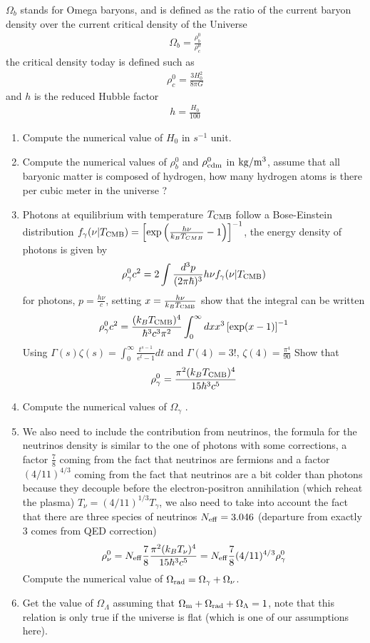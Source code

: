 \documentclass[a4paper, 11pt]{article}
\def\ba{\begin{eqnarray}}
\def\ea{\end{eqnarray}}
\begin{document}
$\Omega_{b}$ stands for Omega baryons, and is defined as the ratio of the current baryon density  over the current critical density of the Universe 
\ba
\Omega_{b} = \frac{\rho^{0}_{b}}{\rho^{0}_{c}}  \nonumber
\ea
the critical density today is defined such as
\ba
\rho^{0}_{c} = \frac{3H^{2}_{0}}{8\pi G}
\ea 
and $h$ is the reduced Hubble factor 
\ba
h = \frac{H_{0}}{100}
\ea
\begin{enumerate}
\item Compute the numerical value of $H_{0}$ in $s^{-1}$ unit.
\item Compute the numerical values of $\rho^{0}_{b}$ and $\rho^{0}_{\rm cdm}$ in $\rm{kg}/m^{3}$,  assume that all baryonic matter is composed of hydrogen, how many hydrogen atoms is there per cubic meter in the universe ?
\item Photons at equilibrium with temperature $T_{\rm CMB}$ follow a Bose-Einstein distribution $f_{\gamma}(\nu | T_{\rm CMB}) = \left[\exp \left(\frac{h\nu}{k_{B}T_{CMB}}-1\right)\right]^{-1}$, the energy density of photons is given by
\ba
\rho^{0}_{\gamma} c^{2}= 2 \int \frac{d^{3}p}{(2\pi \hbar)^{3}} h\nu f_{\gamma}(\nu | T_{\rm CMB}) 
\ea
for photons, $p = \frac{h\nu}{ c}$, setting $x = \frac{h\nu}{k_{B}T_{\rm CMB}}$ show that the integral can be written
\ba
\rho^{0}_{\gamma} c^{2}= \frac{ (k_{B}T_{\rm CMB})^{4}}{\hbar^{3}c^{3}\pi^{2}} \int_{0}^{\infty} dx x^{3}  \left[\exp (x-1)\right]^{-1}
\ea
Using $\Gamma(s) \zeta(s)  = \int_{0}^{\infty} \frac{t^{s-1}}{e^{t}-1}dt$
and  $\Gamma(4) = 3!$, $\zeta(4) = \frac{\pi^{4}}{90}$
Show that
\ba
\rho^{0}_{\gamma}  =  \frac{\pi^{2} (k_{B}T_{\rm CMB})^{4}}{15 \hbar^{3}c^{5}}
\ea
\item Compute the numerical values of $\Omega_{\gamma}$ .
\item We also need to include the contribution from neutrinos, the formula for the neutrinos density is similar to the one of photons with some corrections, a factor $\frac{7}{8}$ coming from the fact that neutrinos are fermions and a factor $(4/11)^{4/3}$ coming from the fact that neutrinos are a bit colder than photons because they decouple before the electron-positron annihilation (which reheat the plasma) $T_{\nu} = (4/11)^{1/3} T_{\gamma}$, we also need to take into account the fact that there are three species of neutrinos $N_{\rm eff} =3.046$ (departure from exactly 3 comes from QED correction)
\ba
\rho^{0}_{\nu}  =  N_{\rm eff}  \frac{7}{8} \frac{\pi^{2} (k_{B}T_{\nu})^{4}}{15 \hbar^{3}c^{5}} = N_{\rm eff}  \frac{7}{8}  (4/11)^{4/3} \rho^{0}_{\gamma}
\ea
Compute the numerical value of $\Omega_{\rm rad} = \Omega_{\gamma} + \Omega_{\nu}$.
\item Get the value of $\Omega_{\Lambda}$ assuming that  $\Omega_{\rm m} + \Omega_{\rm rad} + \Omega_{\Lambda} = 1$, note that this relation is only true if the universe is flat (which is one of our assumptions here).  

\end{enumerate}
\end{document}
